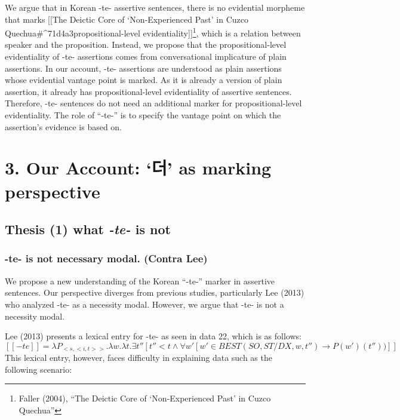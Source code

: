We argue that in Korean -te- assertive sentences, there is no evidential
morpheme that marks {[}{[}The Deictic Core of `Non‐Experienced Past' in
Cuzco Quechua\#\^{}71d4a3\textbar propositional-level
evidentiality{]}{]}\footnote{Faller (2004), ``The Deictic Core of
  `Non‐Experienced Past' in Cuzco Quechua''}, which is a relation
between speaker and the proposition. Instead, we propose that the
propositional-level evidentiality of -te- assertions comes from
conversational implicature of plain assertions. In our account, -te-
assertions are understood as plain assertions whose evidential vantage
point is marked. As it is already a version of plain assertion, it
already has propositional-level evidentiality of assertive sentences.
Therefore, -te- sentences do not need an additional marker for
propositional-level evidentiality. The role of ``-te-'' is to specify
the vantage point on which the assertion's evidence is based on.

\hypertarget{our-account-uxb354-as-marking-perspective}{%
\section{3. Our Account: `더' as marking
perspective}\label{our-account-uxb354-as-marking-perspective}}

\hypertarget{thesis-1-what--te--is-not}{%
\subsection{\texorpdfstring{Thesis (1) what \emph{-te-} is
not}{Thesis (1) what -te- is not}}\label{thesis-1-what--te--is-not}}

\hypertarget{te--is-not-necessary-modal.-contra-lee}{%
\subsubsection{-te- is not necessary modal. (Contra
Lee)}\label{te--is-not-necessary-modal.-contra-lee}}

We propose a new understanding of the Korean ``-te-'' marker in
assertive sentences. Our perspective diverges from previous studies,
particularly Lee (2013) who analyzed -te- as a necessity modal. However,
we argue that -te- is not a necessity modal.

Lee (2013) presents a lexical entry for -te- as seen in data 22, which
is as follows:
\([[-te]] = \lambda P_{<s,<i,t>>}.\lambda w.\lambda t. \exists t''[t''<t \land \forall w'[w' \in BEST(SO,ST/DX, w, t'') \rightarrow P(w')(t''))]]\)
This lexical entry, however, faces difficulty in explaining data such as
the following scenario:

